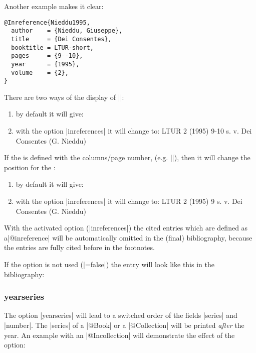 \documentclass[a4paper,
10pt,
greek,
french,
spanish,
italian,
ngerman,
english
]{ltxdoc}
\begin{document}
Another example makes it clear: 
\begin{lstlisting}[style=bibentry,label=Nieddu1995,caption={{@}Inreference\{Nieddu1995,…\} }]
@Inreference{Nieddu1995,
  author    = {Nieddu, Giuseppe},
  title     = {Dei Consentes},
  booktitle = LTUR-short,
  pages     = {9--10},
  year      = {1995},
  volume    = {2},
}
\end{lstlisting}
  \begin{refsection}
There are two ways of the display of |\cite{Nieddu1995}|:
 \begin{enumerate}
 \item by default it will give:  %
 \cite{Nieddu1995}
 \item with the option |inreferences| it will change to:
 LTUR 2 (1995) 9-10 s. v. Dei Consentes (G. Nieddu)
  \end{enumerate}

If the  is defined with the columns/page number, (e.g. |\cite[9]{Nieddu1995}|), 
then it will change the position for the :
\begin{enumerate} 
 \item by default it will give:  %
 \cite[9]{Nieddu1995}
 \item with the option |inreferences| it will change to:
  LTUR 2 (1995) 9 s. v. Dei Consentes (G. Nieddu)
  \end{enumerate}
With the activated option   (|inreferences|) the cited entries which are defined as a|@inreference| will be automatically omitted in the (final) bibliography,
because the entries are fully cited before in the footnotes.

If the option is not used (|=false|) the entry will look like this in the bibliography:
  \end{refsection}


 
\subsubsection{yearseries}\label{yearseries}
The option |yearseries| will lead to a switched order of  the fields |series| and |number|.
The |series| of a |@Book| or a |@Collection| will be printed \emph{after} the year.
An example with an |@Incollection| will demonstrate the effect of the option:
 
\end{document}

